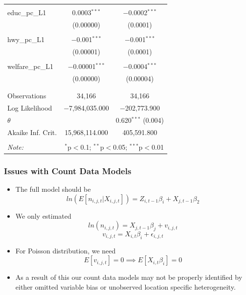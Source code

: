 \documentclass{beamer}
\begin{document}
\begin{frame}
\begin{table}[!htbp]
{{\begin{tabular}{@{\extracolsep{5pt}}lcc}
  & & \\ 
 educ\_pc\_L1 & 0.0003$^{***}$ & $-$0.0002$^{***}$ \\ 
  & (0.00000) & (0.0001) \\ 
  & & \\ 
 hwy\_pc\_L1 & $-$0.001$^{***}$ & $-$0.001$^{***}$ \\ 
  & (0.00001) & (0.0001) \\ 
  & & \\ 
 welfare\_pc\_L1 & $-$0.00001$^{***}$ & $-$0.0004$^{***}$ \\ 
  & (0.00000) & (0.00004) \\ 
  & & \\ 
\hline \\[-1.8ex] 
Observations & 34,166 & 34,166 \\ 
Log Likelihood & $-$7,984,035.000 & $-$202,773.900 \\ 
$\theta$ &  & 0.620$^{***}$  (0.004) \\ 
Akaike Inf. Crit. & 15,968,114.000 & 405,591.800 \\ 
\hline 
\hline \\[-1.8ex] 
\textit{Note:}  & \multicolumn{2}{r}{$^{*}$p$<$0.1; $^{**}$p$<$0.05; $^{***}$p$<$0.01} \\ 
\end{tabular}}}
\end{table} 
\end{frame}

\begin{frame}
\frametitle{Issues with Count Data Models}
\begin{itemize}
\item The full model should be
\begin{equation}
ln(E[n_{i,j,t}|X_{i,j,t}]) =Z_{i,t-1}\beta_{i}+X_{j,t-1}\beta_{2}
\end{equation}
\item We only estimated
$$ln(n_{i,j,t}) = X_{j,t-1}\beta_{j}+v_{i,j,t}$$
$$v_{i,j,t} = X_{i,t}\beta_{i}+\epsilon_{i,j,t}$$
\item For Poisson distribution, we need
$$E[v_{i,j,t}] = 0 \implies E[X_{i,t}\beta_{i}] = 0$$
\item As a result of this our count data models may not be properly identified by either omitted variable bias or unobserved location specific heterogeneity.
\end{itemize}
\end{frame}
\end{document}
